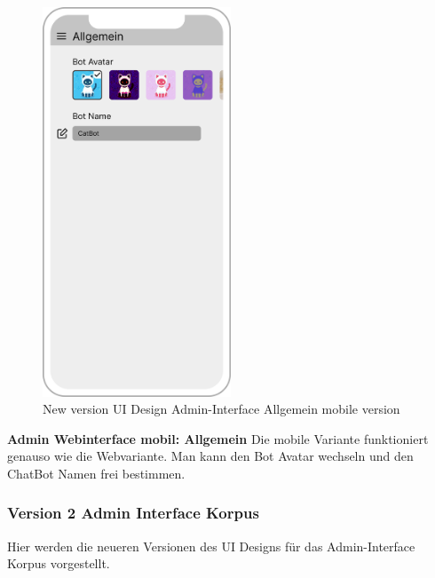 \begin{figure}[H]
    \centering
    \includegraphics[width=0.5\textwidth]{bilder/new vers. UI Design/Allgemein/iPhone X Allgemein III.png}
    \caption{New version UI Design Admin-Interface Allgemein mobile version}
    \label{fig:New version UI Design Admin-Interface Allgemein mobile version}
\end{figure}
\noindent \textbf{Admin Webinterface mobil: Allgemein} \newline
Die mobile Variante funktioniert genauso wie die Webvariante. Man kann den Bot Avatar wechseln und den
ChatBot Namen frei bestimmen.

\newpage

\subsubsection{Version 2 Admin Interface Korpus}
Hier werden die neueren Versionen des UI Designs für das Admin-Interface Korpus vorgestellt.

